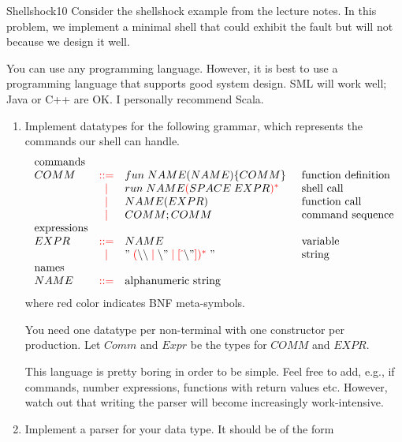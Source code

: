 \documentclass[a4paper]{article}
\begin{document}
\header

\begin{problem}{Shellshock}{10}
Consider the shellshock example from the lecture notes.
In this problem, we implement a minimal shell that could exhibit the fault but will not because we design it well.

You can use any programming language.
However, it is best to use a programming language that supports good system design.
SML will work well; Java or C++ are OK. I personally recommend Scala.

\renewcommand{\bnf}[1]{{\color{red}#1}}
\begin{enumerate}
\item Implement datatypes for the following grammar, which represents the commands our shell can handle.
\[\begin{array}{lcl@{\tb}l}
 \text{commands} \\
 COMM & \bbc & fun\;NAME(NAME) \{COMM\} & \text{function definition} \\
      & \bnfalt & run\;NAME \rep{\bnfbracket{SPACE\; EXPR}} & \text{shell call}\\
      & \bnfalt & NAME(EXPR) & \text{function call}\\
      & \bnfalt & COMM ; COMM & \text{command sequence}\\
 \text{expressions} \\
 EXPR & \bbc & NAME & \text{variable} \\
      & \bnfalt& "\; \rep{\bnfbracket{\backslash\backslash \bnfalt \backslash" \bnfalt \bnfnegchoice{\backslash"}}} \;" & \text{string} \\
 \text{names} \\
 NAME & \bbc & \text{alphanumeric string} &
\end{array}\]
where red color indicates BNF meta-symbols.

You need one datatype per non-terminal with one constructor per production.
Let $Comm$ and $Expr$ be the types for $COMM$ and $EXPR$.

This language is pretty boring in order to be simple.
Feel free to add, e.g., if commands, number expressions, functions with return values etc.
However, watch out that writing the parser will become increasingly work-intensive.

\item Implement a parser for your data type. It should be of the form
\begin{acode}
\\
\end{acode}


\end{enumerate}
\end{problem}
\end{document}
